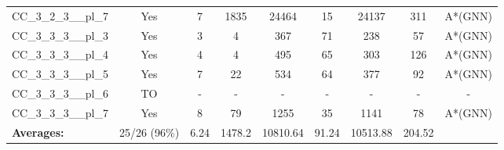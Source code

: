 \documentclass{article}
\begin{document}
\begin{tabular}{lcccccccc}
CC\_3\_2\_3\_\_pl\_7 & Yes & 7 & 1835 & 24464 & 15 & 24137 & 311 & A*(GNN) \\
CC\_3\_3\_3\_\_pl\_3 & Yes & 3 & 4 & 367 & 71 & 238 & 57 & A*(GNN) \\
CC\_3\_3\_3\_\_pl\_4 & Yes & 4 & 4 & 495 & 65 & 303 & 126 & A*(GNN) \\
CC\_3\_3\_3\_\_pl\_5 & Yes & 7 & 22 & 534 & 64 & 377 & 92 & A*(GNN) \\
CC\_3\_3\_3\_\_pl\_6 & TO & - & - & - & - & - & - & - \\
CC\_3\_3\_3\_\_pl\_7 & Yes & 8 & 79 & 1255 & 35 & 1141 & 78 & A*(GNN) \\
\textbf{Averages:} & 25/26 (96\%) & 6.24 & 1478.2 & 10810.64 & 91.24 & 10513.88 & 204.52 & \\
\bottomrule
\end{tabular}
\\[0.7cm]
\end{document}
